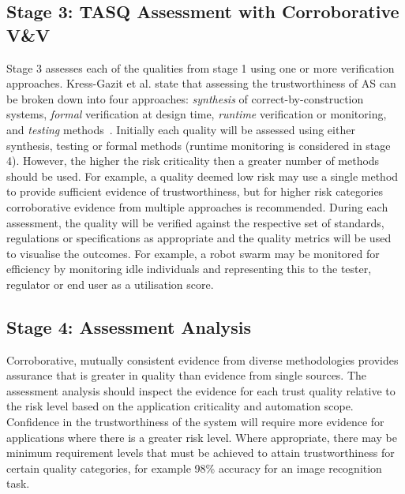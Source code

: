 \subsection{Stage 3: TASQ Assessment with Corroborative V\&V}

Stage 3 assesses each of the qualities from stage 1 using one or more verification approaches. 
%
Kress-Gazit et al. state that assessing the trustworthiness of AS can be broken down into four approaches: \emph{synthesis} of correct-by-construction systems, \emph{formal} verification at design time, \emph{runtime} verification or monitoring, and \emph{testing} methods~\cite{kress2021formalizing}. 
%
Initially each quality will be assessed using either synthesis, testing or formal methods (runtime monitoring is considered in stage 4). However, the higher the risk criticality then a greater number of methods should be used. For example, a quality deemed low risk may use a single method to provide sufficient evidence of trustworthiness, but for higher risk categories corroborative evidence from multiple approaches is recommended. 
%
During each assessment, the quality will be verified against the respective set of standards, regulations or specifications as appropriate and the quality metrics will be used to visualise the outcomes. 
%
For example, a robot swarm may be monitored for efficiency by monitoring idle individuals and representing this to the tester, regulator or end user as a utilisation score. 


\subsection{Stage 4: Assessment Analysis}


Corroborative, mutually consistent evidence from diverse methodologies provides assurance that is greater in quality than evidence from single sources. 
%
The assessment analysis should inspect the evidence for each trust quality relative to the risk level based on the application criticality and automation scope. Confidence in the trustworthiness of the system will require more evidence for applications where there is a greater risk level. 
%
Where appropriate, there may be minimum requirement levels that must be achieved to attain trustworthiness for certain quality categories, for example 98\% accuracy for an image recognition task.

